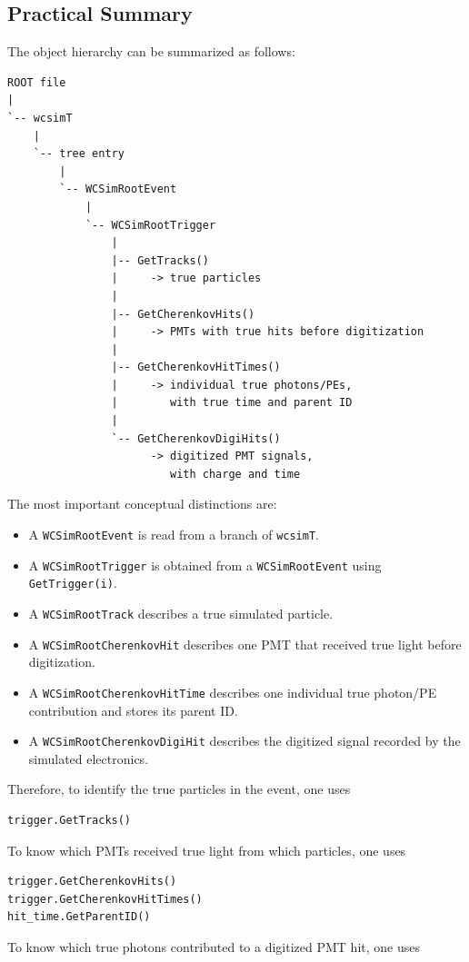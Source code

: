 \documentclass{article}
\numberwithin{table}{subsection}
\numberwithin{figure}{subsection}
\numberwithin{equation}{subsection}
\numberwithin{footnote}{subsection}
\begin{document}
\subsection{Practical Summary}

The object hierarchy can be summarized as follows:

\begin{lstlisting}
ROOT file
|
`-- wcsimT
    |
    `-- tree entry
        |
        `-- WCSimRootEvent
            |
            `-- WCSimRootTrigger
                |
                |-- GetTracks()
                |     -> true particles
                |
                |-- GetCherenkovHits()
                |     -> PMTs with true hits before digitization
                |
                |-- GetCherenkovHitTimes()
                |     -> individual true photons/PEs,
                |        with true time and parent ID
                |
                `-- GetCherenkovDigiHits()
                      -> digitized PMT signals,
                         with charge and time
\end{lstlisting}
The most important conceptual distinctions are:

\begin{itemize}
    \item A \texttt{WCSimRootEvent} is read from a branch of \texttt{wcsimT}.
    \item A \texttt{WCSimRootTrigger} is obtained from a
    \texttt{WCSimRootEvent} using \texttt{GetTrigger(i)}.
    \item A \texttt{WCSimRootTrack} describes a true simulated particle.
    \item A \texttt{WCSimRootCherenkovHit} describes one PMT that received true
    light before digitization.
    \item A \texttt{WCSimRootCherenkovHitTime} describes one individual true
    photon/PE contribution and stores its parent ID.
    \item A \texttt{WCSimRootCherenkovDigiHit} describes the digitized signal
    recorded by the simulated electronics.
\end{itemize}
Therefore, to identify the true particles in the event, one uses

\begin{lstlisting}
trigger.GetTracks()
\end{lstlisting}
To know which PMTs received true light from which particles, one uses

\begin{lstlisting}
trigger.GetCherenkovHits()
trigger.GetCherenkovHitTimes()
hit_time.GetParentID()
\end{lstlisting}
To know which true photons contributed to a digitized PMT hit, one uses
\end{document}
